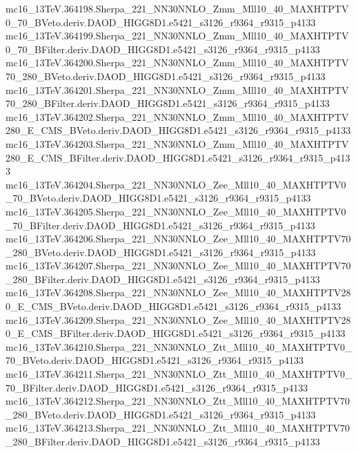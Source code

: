 mc16_13TeV.364198.Sherpa_221_NN30NNLO_Zmm_Mll10_40_MAXHTPTV0_70_BVeto.deriv.DAOD_HIGG8D1.e5421_s3126_r9364_r9315_p4133 \\
mc16_13TeV.364199.Sherpa_221_NN30NNLO_Zmm_Mll10_40_MAXHTPTV0_70_BFilter.deriv.DAOD_HIGG8D1.e5421_s3126_r9364_r9315_p4133 \\
mc16_13TeV.364200.Sherpa_221_NN30NNLO_Zmm_Mll10_40_MAXHTPTV70_280_BVeto.deriv.DAOD_HIGG8D1.e5421_s3126_r9364_r9315_p4133 \\
mc16_13TeV.364201.Sherpa_221_NN30NNLO_Zmm_Mll10_40_MAXHTPTV70_280_BFilter.deriv.DAOD_HIGG8D1.e5421_s3126_r9364_r9315_p4133 \\
mc16_13TeV.364202.Sherpa_221_NN30NNLO_Zmm_Mll10_40_MAXHTPTV280_E_CMS_BVeto.deriv.DAOD_HIGG8D1.e5421_s3126_r9364_r9315_p4133 \\
mc16_13TeV.364203.Sherpa_221_NN30NNLO_Zmm_Mll10_40_MAXHTPTV280_E_CMS_BFilter.deriv.DAOD_HIGG8D1.e5421_s3126_r9364_r9315_p4133 \\
mc16_13TeV.364204.Sherpa_221_NN30NNLO_Zee_Mll10_40_MAXHTPTV0_70_BVeto.deriv.DAOD_HIGG8D1.e5421_s3126_r9364_r9315_p4133 \\
mc16_13TeV.364205.Sherpa_221_NN30NNLO_Zee_Mll10_40_MAXHTPTV0_70_BFilter.deriv.DAOD_HIGG8D1.e5421_s3126_r9364_r9315_p4133 \\
mc16_13TeV.364206.Sherpa_221_NN30NNLO_Zee_Mll10_40_MAXHTPTV70_280_BVeto.deriv.DAOD_HIGG8D1.e5421_s3126_r9364_r9315_p4133 \\
mc16_13TeV.364207.Sherpa_221_NN30NNLO_Zee_Mll10_40_MAXHTPTV70_280_BFilter.deriv.DAOD_HIGG8D1.e5421_s3126_r9364_r9315_p4133 \\
mc16_13TeV.364208.Sherpa_221_NN30NNLO_Zee_Mll10_40_MAXHTPTV280_E_CMS_BVeto.deriv.DAOD_HIGG8D1.e5421_s3126_r9364_r9315_p4133 \\
mc16_13TeV.364209.Sherpa_221_NN30NNLO_Zee_Mll10_40_MAXHTPTV280_E_CMS_BFilter.deriv.DAOD_HIGG8D1.e5421_s3126_r9364_r9315_p4133 \\
mc16_13TeV.364210.Sherpa_221_NN30NNLO_Ztt_Mll10_40_MAXHTPTV0_70_BVeto.deriv.DAOD_HIGG8D1.e5421_s3126_r9364_r9315_p4133 \\
mc16_13TeV.364211.Sherpa_221_NN30NNLO_Ztt_Mll10_40_MAXHTPTV0_70_BFilter.deriv.DAOD_HIGG8D1.e5421_s3126_r9364_r9315_p4133 \\
mc16_13TeV.364212.Sherpa_221_NN30NNLO_Ztt_Mll10_40_MAXHTPTV70_280_BVeto.deriv.DAOD_HIGG8D1.e5421_s3126_r9364_r9315_p4133 \\
mc16_13TeV.364213.Sherpa_221_NN30NNLO_Ztt_Mll10_40_MAXHTPTV70_280_BFilter.deriv.DAOD_HIGG8D1.e5421_s3126_r9364_r9315_p4133 \\
